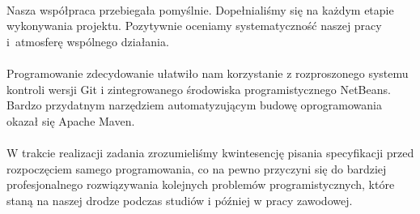 \documentclass[a4paper]{article}
\begin{document}
\paragraph{}Nasza współpraca przebiegała pomyślnie. Dopełnialiśmy się na każdym etapie wykonywania projektu. Pozytywnie oceniamy systematyczność naszej pracy i~atmosferę wspólnego działania.
\paragraph{}Programowanie zdecydowanie ułatwiło nam korzystanie z rozproszonego systemu kontroli wersji Git i zintegrowanego środowiska programistycznego NetBeans. Bardzo przydatnym narzędziem automatyzującym budowę oprogramowania okazał się Apache Maven.
\paragraph{}W trakcie realizacji zadania zrozumieliśmy kwintesencję pisania specyfikacji przed rozpoczęciem samego programowania, co na pewno przyczyni się do bardziej profesjonalnego rozwiązywania kolejnych problemów programistycznych, które staną na naszej drodze podczas studiów i później w pracy zawodowej.
\label{end}
\end{document}
